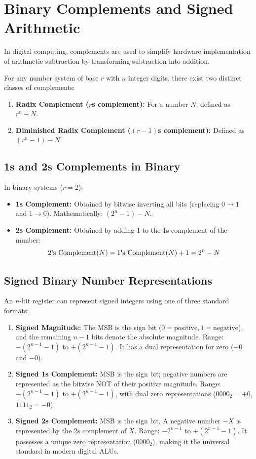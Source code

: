 \section{Binary Complements and Signed Arithmetic}
In digital computing, complements are used to simplify hardware implementation of arithmetic subtraction by transforming subtraction into addition.

For any number system of base $r$ with $n$ integer digits, there exist two distinct classes of complements:
\begin{enumerate}
    \item \textbf{Radix Complement ($r$\textquotesingle s complement):} For a number $N$, defined as $r^n - N$.
    \item \textbf{Diminished Radix Complement ($(r-1)$\textquotesingle s complement):} Defined as $(r^n - 1) - N$.
\end{enumerate}

\subsection{1\textquotesingle s and 2\textquotesingle s Complements in Binary}
In binary systems ($r=2$):
\begin{itemize}
    \item \textbf{1\textquotesingle s Complement:} Obtained by bitwise inverting all bits (replacing $0 \to 1$ and $1 \to 0$). Mathematically: $(2^n - 1) - N$.
    \item \textbf{2\textquotesingle s Complement:} Obtained by adding 1 to the 1\textquotesingle s complement of the number:
    \begin{equation}
    \text{2\textquotesingle s Complement}(N) = \text{1\textquotesingle s Complement}(N) + 1 = 2^n - N
    \end{equation}
\end{itemize}

\subsection{Signed Binary Number Representations}
An $n$-bit register can represent signed integers using one of three standard formats:
\begin{enumerate}
    \item \textbf{Signed Magnitude:} The MSB is the sign bit ($0 = \text{positive}, 1 = \text{negative}$), and the remaining $n-1$ bits denote the absolute magnitude. Range: $-(2^{n-1}-1)$ to $+(2^{n-1}-1)$. It has a dual representation for zero ($+0$ and $-0$).
    \item \textbf{Signed 1\textquotesingle s Complement:} MSB is the sign bit; negative numbers are represented as the bitwise NOT of their positive magnitude. Range: $-(2^{n-1}-1)$ to $+(2^{n-1}-1)$, with dual zero representations ($0000_2 = +0$, $1111_2 = -0$).
    \item \textbf{Signed 2\textquotesingle s Complement:} MSB is the sign bit. A negative number $-X$ is represented by the 2\textquotesingle s complement of $X$. Range: $-2^{n-1}$ to $+(2^{n-1}-1)$. It possesses a unique zero representation ($0000_2$), making it the universal standard in modern digital ALUs.
\end{enumerate}


